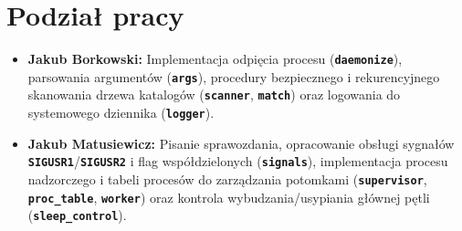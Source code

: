 \documentclass{article}
\begin{document}
	\section{Podział pracy}
	\begin{itemize}
		\item \textbf{Jakub Borkowski:} Implementacja odpięcia procesu (\textbf{\texttt{daemonize}}), parsowania argumentów (\textbf{\texttt{args}}), procedury bezpiecznego i rekurencyjnego skanowania drzewa katalogów (\textbf{\texttt{scanner}}, \textbf{\texttt{match}}) oraz logowania do systemowego dziennika (\textbf{\texttt{logger}}).
		\item \textbf{Jakub Matusiewicz:} Pisanie sprawozdania, opracowanie obsługi sygnałów \textbf{\texttt{SIGUSR1}}/\textbf{\texttt{SIGUSR2}} i flag współdzielonych (\textbf{\texttt{signals}}), implementacja procesu nadzorczego i tabeli procesów do zarządzania potomkami (\textbf{\texttt{supervisor}}, \textbf{\texttt{proc\_table}}, \textbf{\texttt{worker}}) oraz kontrola wybudzania/usypiania głównej pętli (\textbf{\texttt{sleep\_control}}).
	\end{itemize}
\end{document}
